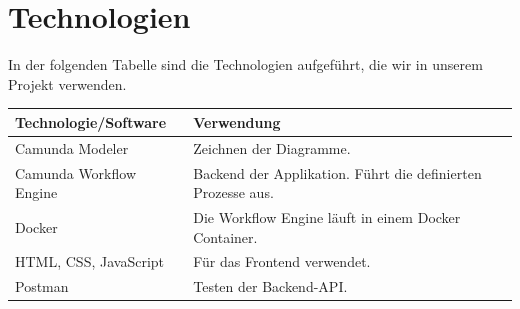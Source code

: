 \section{Technologien}\label{sec:technologien}
In der folgenden Tabelle sind die Technologien aufgeführt, die wir in unserem Projekt verwenden.

\begin{longtable}{|p{}|p{}|}
   \hline
   \textbf{Technologie/Software} & \textbf{Verwendung}
   \\ \hline
   Camunda Modeler & Zeichnen der Diagramme.
   \\ \hline
   Camunda Workflow Engine & Backend der Applikation.
   Führt die definierten Prozesse aus.
   \\ \hline
   Docker
   & Die Workflow Engine läuft in einem Docker Container.
   \\ \hline
   HTML, CSS, JavaScript
   & Für das Frontend verwendet.
   \\ \hline
   Postman
   & Testen der Backend-API.
   \\ \hline
\end{longtable}\label{tab:technologies}
